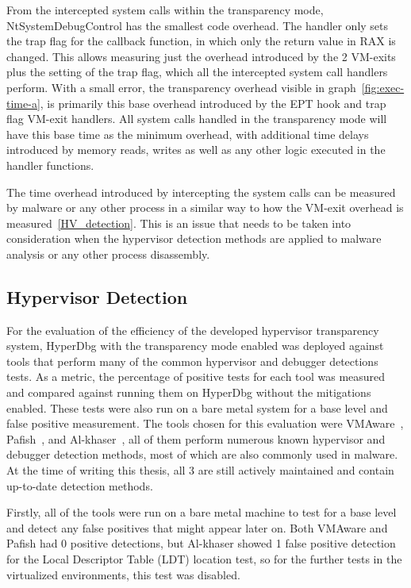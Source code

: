 From the intercepted system calls within the transparency mode, NtSystemDebugControl has the smallest code overhead. 
The handler only sets the trap flag for the callback function, in which only the return value in RAX is changed. 
This allows measuring just the overhead introduced by the 2 VM-exits plus the setting of the trap flag, which all the intercepted system call handlers perform. 
With a small error, the transparency overhead visible in graph~\ref{fig:exec-time-a}, is primarily this base overhead introduced by the EPT hook and trap flag VM-exit handlers. 
All system calls handled in the transparency mode will have this base time as the minimum overhead, with additional time delays introduced by memory reads, writes 
as well as any other logic executed in the handler functions.

The time overhead introduced by intercepting the system calls can be measured by malware or any other process in a similar way to how the VM-exit overhead is measured~\ref{HV_detection}. 
This is an issue that needs to be taken into consideration when the hypervisor detection methods are applied to malware analysis or any other process disassembly.

\subsection{Hypervisor Detection}\label{HV-detection-eval}
For the evaluation of the efficiency of the developed hypervisor transparency system, HyperDbg with the transparency mode enabled was deployed against tools that perform many of 
the common hypervisor and debugger detections tests. As a metric, the percentage of positive tests for each tool was measured and compared against running them on HyperDbg 
without the mitigations enabled. These tests were also run on a bare metal system for a base level and false positive measurement. 
The tools chosen for this evaluation were VMAware~\cite{vmaware}, Pafish~\cite{pafish}, and Al-khaser~\cite{al-khaser}, all of them perform numerous known hypervisor and debugger detection methods, 
most of which are also commonly used in malware. At the time of writing this thesis, all 3 are still actively maintained and contain up-to-date detection methods.

Firstly, all of the tools were run on a bare metal machine to test for a base level and detect any false positives that might appear later on. 
Both VMAware and Pafish had 0 positive detections, but Al-khaser showed 1 false positive detection for the Local Descriptor Table (LDT) location test, 
so for the further tests in the virtualized environments, this test was disabled.

